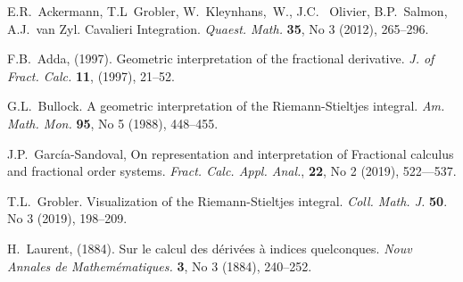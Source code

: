 \documentclass[twoside,reqno,11pt]{fcaa-var} %
\begin{document}
 \begin{thebibliography}{99}
 \normalsize
 
 E.R.~Ackermann, T.L~Grobler, W.~Kleynhans,~W., J.C.~ Olivier, B.P.~Salmon, A.J.~van Zyl. Cavalieri
Integration. \textit{Quaest. Math.} \textbf{35}, No 3 (2012), 265--296.

 F.B.~Adda, (1997). Geometric interpretation of the fractional derivative. \textit{J. of Fract. Calc.} \textbf{11}, (1997), 21--52.

 G.L.~Bullock. A geometric interpretation of the Riemann-Stieltjes integral. \textit{Am. Math. Mon.} \textbf{95}, No 5 (1988), 448--455.





 J.P.~Garc\'{i}a-Sandoval, On representation and interpretation of Fractional calculus and fractional order systems. \textit{Fract. Calc. Appl. Anal.}, \textbf{22}, No 2 (2019), 522---537.


 T.L.~Grobler. Visualization of the Riemann-Stieltjes integral. \textit{Coll. Math. J.} \textbf{50}. No 3 (2019), 198--209.

 H.~Laurent, (1884). Sur le calcul des d\'{e}riv\'{e}es \`{a} indices quelconques. \textit{Nouv Annales de Mathem\'{e}matiques.} \textbf{3}, No 3 (1884), 240--252. 



\end{thebibliography}
\end{document}

